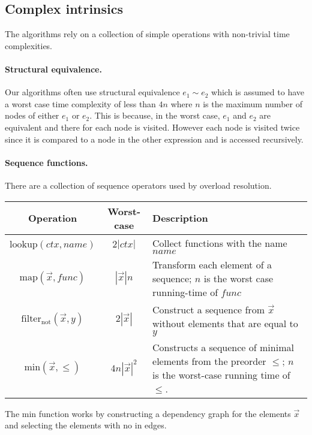 \subsection{Complex intrinsics}
\label{subsec:intrinsics.complex}

The algorithms rely on a collection of simple operations with non-trivial time complexities.

\paragraph{Structural equivalence.}  Our algorithms often use structural equivalence $e_1 \sim e_2$ which is assumed to have a worst case time complexity of less than $4n$ where $n$ is the maximum number of nodes of either $e_1$ or $e_2$. This is because, in the worst case, $e_1$ and $e_2$ are equivalent and there for each node is visited. However each node is visited twice since it is compared to a node in the other expression and is accessed recursively.

\paragraph{Sequence functions.}  There are a collection of sequence operators used by overload resolution.
  \begin{center}
    \begin{tabular}{|c|c|m{8cm}|}
      \hline
        Operation & Worst-case & Description \\
      \hline
        $\mbox{lookup}(ctx, name)$
          & $2 |ctx|$
          & Collect functions with the name $name$ \\
      \hline
        $\mbox{map}(\overrightarrow{x}, func)$
          & $|\overrightarrow{x}| n$
          & Transform each element of a sequence; $n$ is the worst case
            running-time of $func$ \\
      \hline
        $\mbox{filter}_{\mbox{not}}(\overrightarrow{x}, y)$
          & $2 |\overrightarrow{x}|$
          & Construct a sequence from $\overrightarrow{x}$ without elements that
            are equal to $y$ \\
      \hline
        $\mbox{min}(\overrightarrow{x}, \leq)$
          & $4 n |\overrightarrow{x}|^2$
          & Constructs a sequence of minimal elements from the preorder $\leq$;
            $n$ is the worst-case running time of $\leq$. \\
      \hline
    \end{tabular}
  \end{center}
The min function works by constructing a dependency graph for the elements $\overrightarrow{x}$ and selecting the elements with no in edges.

